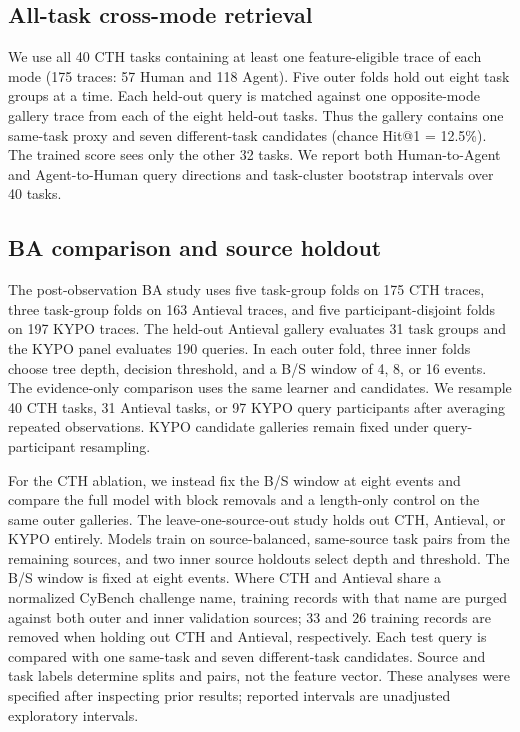 \documentclass[10pt]{article}
\begin{document}
\subsection{All-task cross-mode retrieval}
We use all 40 CTH tasks containing at least one feature-eligible trace of each mode (175 traces: 57 Human and 118 Agent). Five outer folds hold out eight task groups at a time. Each held-out query is matched against one opposite-mode gallery trace from each of the eight held-out tasks. Thus the gallery contains one same-task proxy and seven different-task candidates (chance Hit@1 = 12.5\%). The trained score sees only the other 32 tasks. We report both Human-to-Agent and Agent-to-Human query directions and task-cluster bootstrap intervals over 40 tasks.

\subsection{BA comparison and source holdout}
The post-observation BA study uses five task-group folds on 175 CTH traces, three task-group folds on 163 Antieval traces, and five participant-disjoint folds on 197 KYPO traces. The held-out Antieval gallery evaluates 31 task groups and the KYPO panel evaluates 190 queries. In each outer fold, three inner folds choose tree depth, decision threshold, and a B/S window of 4, 8, or 16 events. The evidence-only comparison uses the same learner and candidates. We resample 40 CTH tasks, 31 Antieval tasks, or 97 KYPO query participants after averaging repeated observations. KYPO candidate galleries remain fixed under query-participant resampling.

For the CTH ablation, we instead fix the B/S window at eight events and compare the full model with block removals and a length-only control on the same outer galleries. The leave-one-source-out study holds out CTH, Antieval, or KYPO entirely. Models train on source-balanced, same-source task pairs from the remaining sources, and two inner source holdouts select depth and threshold. The B/S window is fixed at eight events. Where CTH and Antieval share a normalized CyBench challenge name, training records with that name are purged against both outer and inner validation sources; 33 and 26 training records are removed when holding out CTH and Antieval, respectively. Each test query is compared with one same-task and seven different-task candidates. Source and task labels determine splits and pairs, not the feature vector. These analyses were specified after inspecting prior results; reported intervals are unadjusted exploratory intervals.
\end{document}
